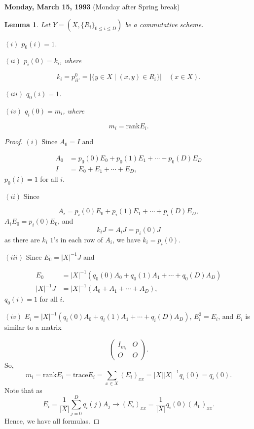 \documentclass[
]{book}
\newtheorem{lemma}{Lemma}[chapter]
\theoremstyle{definition}
\theoremstyle{definition}
\theoremstyle{definition}
\theoremstyle{definition}
\theoremstyle{remark}
\begin{document}
\textbf{Monday, March 15, 1993} (Monday after Spring break)

\begin{lemma}
\protect\hypertarget{lem:pij-qij}{}\label{lem:pij-qij}Let \(Y = (X, \{R_i\}_{0\leq i\leq D})\) be a commutative scheme.

\((i)\) \(p_0(i) = 1\).

\((ii)\) \(p_i(0) = k_i\), where

\[k_i = p^0_{ii'} = |\{y\in X\mid (x,y)\in R_i\}| \quad (x\in X).\]

\((iii)\) \(q_0(i) = 1\).

\((iv)\) \(q_i(0) = m_i\), where

\[m_i = \mathrm{rank} E_i.\]
\end{lemma}

\begin{proof}
\leavevmode

\((i)\) Since \(A_0 = I\) and

\begin{align}
A_0 & = p_0(0)E_0 + p_0(1)E_1 + \cdots + p_0(D)E_D\\
I & = E_0 + E_1 + \cdots + E_D,
\end{align}
\(p_0(i) = 1\) for all \(i\).

\((ii)\) Since

\[A_i = p_i(0)E_0 + p_i(1)E_1 + \cdots + p_i(D)E_D,\]
\(A_i E_0 = p_i(0)E_0\), and
\[k_i J = A_i J = p_i(0)J\]
as there are \(k_i\) \(1\)'s in each row of \(A_i\), we have \(k_i = p_i(0)\).

\((iii)\) Since \(E_0 = |X|^{-1}J\) and

\begin{align}
E_0 & = |X|^{-1}(q_0(0)A_0 + q_0(1)A_1 + \cdots + q_0(D)A_D)\\
|X|^{-1}J & = |X|^{-1}(A_0 + A_1 + \cdots + A_D),
\end{align}
\(q_0(i) = 1\) for all \(i\).

\((iv)\) \(E_i = |X|^{-1}(q_i(0)A_0 + q_i(1)A_1 + \cdots + q_i(D)A_D)\), \(E_i^2 = E_i\), and \(E_i\) is similar to a matrix

\[\begin{pmatrix} I_{m_i} & O \\ O & O\end{pmatrix}.\]
So,
\[m_i = \mathrm{rank}E_i = \mathrm{trace} E_i = \sum_{x\in X}(E_i)_{xx} = |X||X|^{-1}q_i(0) = q_i(0).\]
Note that as
\[E_i = \frac{1}{|X|}\sum_{j=0}^D q_i(j)A_j \to (E_i)_{xx} = \frac{1}{|X|}q_i(0)(A_0)_{xx}.\]
Hence, we have all formulas.

\end{proof}
\end{document}
